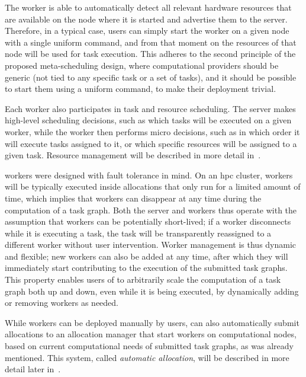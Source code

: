 The worker is able to automatically detect all relevant hardware resources that are available on
the node where it is started and advertise them to the server. Therefore, in a typical case, users
can simply start the worker on a given node with a single uniform command, and from that moment on
the resources of that node will be used for task execution. This adheres to the second principle of
the proposed meta-scheduling design, where computational providers should be generic (not tied to
any specific task or a set of tasks), and it should be possible to start them using a uniform
command, to make their deployment trivial.

Each worker also participates in task and resource scheduling. The server makes high-level
scheduling decisions, such as which tasks will be executed on a given worker, while the worker then
performs micro decisions, such as in which order it will execute tasks assigned to it, or which
specific resources will be assigned to a given task. Resource management will be described in more
detail in~.

\hyperqueue{} workers were designed with fault tolerance in mind. On an
\gls{hpc}
cluster, workers will be typically executed inside allocations that only run for a limited amount
of time, which implies that workers can disappear at any time during the computation of a task
graph. Both the server and workers thus operate with the assumption that workers can be potentially
short-lived; if a worker disconnects while it is executing a task, the task will be transparently
reassigned to a different worker without user intervention. Worker management is thus dynamic and
flexible; new workers can also be added at any time, after which they will immediately start
contributing to the execution of the submitted task graphs. This property enables users of
\hq{} to arbitrarily scale the computation of a task graph both up and down, even
while it is being executed, by dynamically adding or removing workers as needed.

While workers can be deployed manually by users, \hq{} can also automatically
submit allocations to an allocation manager that start workers on computational nodes, based on
current computational needs of submitted task graphs, as was already mentioned. This system, called
\emph{automatic allocation}, will be described in more detail later in~.

